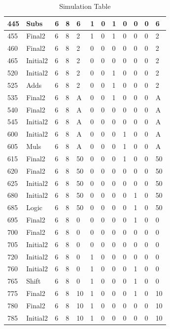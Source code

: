 \documentclass[12pt]{article}
\begin{document}
\begin{table}[H]
\begin{tabular}{|l|l|l|l|l|l|l|l|l|l|l|l|}
        \hline
        445 & Subs & 6 & 8&6&1&0&1&0&0&0&6\\
        \hline
        455 & Final2 & 6 & 8&2&1&0&1&0&0&0&2\\
        \hline
        460 & Final2 & 6 & 8&2&0&0&0&0&0&0&2\\
        \hline
        465 & Initial2 & 6 & 8&2&0&0&0&0&0&0&2\\
        \hline
        520 & Initial2 & 6 & 8&2&0&0&1&0&0&0&2\\
        \hline
        525 & Adds& 6 & 8&2&0&0&1&0&0&0&2\\
        \hline
        535 & Final2& 6 & 8&A&0&0&1&0&0&0&A\\
        \hline
        540 & Final2& 6 & 8&A&0&0&0&0&0&0&A\\
        \hline
        545 & Initial2& 6 & 8&A&0&0&0&0&0&0&A\\
        \hline
        600 & Initial2& 6 & 8&A&0&0&0&1&0&0&A\\
        \hline
        605 & Muls& 6 & 8&A&0&0&0&1&0&0&A\\
        \hline
        615 & Final2& 6 & 8&50&0&0&0&1&0&0&50\\
        \hline
        620 & Final2& 6 & 8&50&0&0&0&0&0&0&50\\
        \hline
        625 & Initial2& 6 & 8&50&0&0&0&0&0&0&50\\
        \hline
        680 & Initial2& 6 & 8&50&0&0&0&0&1&0&50\\
        \hline
        685 & Logic& 6 & 8&50&0&0&0&0&1&0&50\\
        \hline
        695 & Final2& 6 & 8&0&0&0&0&0&1&0&0\\
        \hline
        700 & Final2& 6 & 8&0&0&0&0&0&0&0&0\\
        \hline
        705 & Initial2& 6 & 8&0&0&0&0&0&0&0&0\\
        \hline
        720 & Initial2& 6 & 8&0&1&0&0&0&0&0&0\\
        \hline
        760 & Initial2& 6 & 8&0&1&0&0&0&1&0&0\\
        \hline
        765 & Shift& 6 & 8&0&1&0&0&0&1&0&0\\
        \hline
        775 & Final2& 6 & 8&10&1&0&0&0&1&0&10\\
        \hline
        780 & Final2& 6 & 8&10&1&0&0&0&0&0&10\\
        \hline
        785 & Initial2& 6 & 8&10&1&0&0&0&0&0&10\\
        \hline
        
    \end{tabular}
    \caption{Simulation Table}
    \label{tab:simulation}
     
\end{table}
\end{document}

